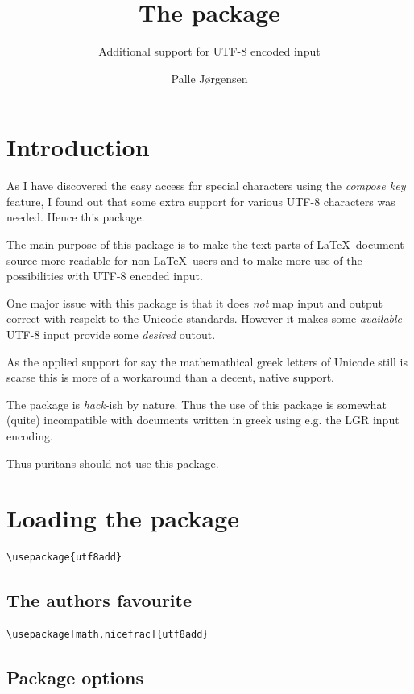 \documentclass[a4paper,british,parskip=half,11pt,fleqn]{scrartcl}
\author{Palle J\o rgensen} %
\title{The \texttt{\jobname} package} %
\subtitle{Additional support for UTF-8 encoded input} %
\begin{document}
\maketitle

\section{Introduction}
\label{sec:introduction}

As I have discovered the easy access for special characters using the
\emph{compose key} feature, I found out that some extra support for
various UTF-8 characters was needed. Hence this package.

The main purpose of this package is to make the text parts of \LaTeX\
document source more readable for non-\LaTeX\ users and to make more
use of the possibilities with UTF-8 encoded input.

One major issue with this package is that it does \emph{not} map input
and output correct with respekt to the Unicode standards. However it
makes some \emph{available} UTF-8 input provide some \emph{desired}
outout.

As the applied support for say the mathemathical greek letters of
Unicode still is scarse this is more of a workaround than a decent,
native support.

The package is \emph{hack}-ish by nature. Thus the use of this
package is somewhat (quite) incompatible with documents written in
greek using e.g. the LGR input encoding.

Thus puritans should not use this package.

\section{Loading the package}
\label{sec:loading-package}
\begin{lstlisting}
\usepackage{utf8add}
\end{lstlisting}

\subsection{The authors favourite}
\label{sec:authors-favourite}

\begin{lstlisting}
\usepackage[math,nicefrac]{utf8add}
\end{lstlisting}

\subsection{Package options}
\label{sec:package-options}
\end{document}
